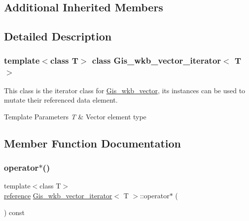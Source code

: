 \subsection*{Additional Inherited Members}


\subsection{Detailed Description}
\subsubsection*{template$<$class T$>$\newline
class Gis\+\_\+wkb\+\_\+vector\+\_\+iterator$<$ T $>$}

This class is the iterator class for \mbox{\hyperlink{classGis__wkb__vector}{Gis\+\_\+wkb\+\_\+vector}}, its instances can be used to mutate their referenced data element. 
\begin{DoxyTemplParams}{Template Parameters}
{\em T} & Vector element type \\
\hline
\end{DoxyTemplParams}


\subsection{Member Function Documentation}
\mbox{\label{classGis__wkb__vector__iterator_a53a06c139570074e15bdd5bfdbb06878}} 
\subsubsection{\texorpdfstring{operator$\ast$()}{operator*()}}
{\footnotesize\ttfamily template$<$class T$>$ \\
\mbox{\hyperlink{classGis__wkb__vector__const__iterator_a320ffe7a48e9c6440eb76d321ff8c5a2}{reference}} \mbox{\hyperlink{classGis__wkb__vector__iterator}{Gis\+\_\+wkb\+\_\+vector\+\_\+iterator}}$<$ T $>$\+::operator$\ast$ (\begin{DoxyParamCaption}{ }\end{DoxyParamCaption}) const\hspace{0.3cm}{\ttfamily [inline]}}



